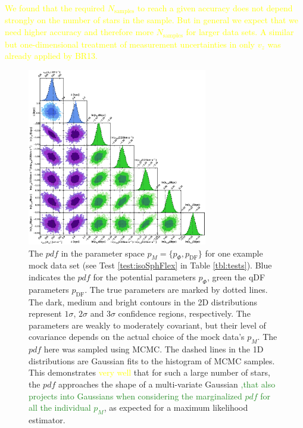 \documentclass[iop,revtex4,numberedappendix,appendixfloats]{emulateapj}
\newcommand{\pdf}{\ensuremath{pdf}}
\newcommand{\pmodel}{\ensuremath{p_M}}
\newcommand{\NEW}[1]{\textcolor{ForestGreen}{#1}}
\newcommand{\OLD}[1]{\textcolor{Yellow}{#1}}%
\begin{document}
\OLD{We found that the required $N_\text{samples}$ to reach a given accuracy does not depend strongly on the number of stars in the sample. But in general we expect that we need higher accuracy and therefore more $N_\text{samples}$ for larger data sets.}
\OLD{A similar but one-dimensional treatment of measurement uncertainties in only $v_z$ was already applied by BR13.}


\begin{figure}[!htbp]
\centering
\includegraphics[width=0.7\textwidth]{figs/isoSphFlex_short_hot_2kpc_triangle_MCMC.eps}
\caption{The \pdf{} in the parameter space $\pmodel{} = \{p_\Phi,p_\text{DF}\}$ for one example mock data set (see Test \ref{test:isoSphFlex} in Table \ref{tbl:tests}). Blue indicates the \pdf{} for the potential parameters $p_\Phi$, green the qDF parameters $p_\text{DF}$. The true parameters are marked by dotted lines. The dark, medium and bright contours in the 2D distributions represent $1\sigma$, $2\sigma$ and $3\sigma$ confidence regions, respectively. The parameters are weakly to moderately covariant, but their level of covariance depends on the actual choice of the mock data's \pmodel{}. The \pdf{} here was sampled using MCMC. The dashed lines in the 1D distributions are Gaussian fits to the histogram of MCMC samples. This demonstrates \OLD{very well} that for such a large number of stars, the \pdf{} approaches the shape of a multi-variate Gaussian \NEW{,that also projects into Gaussians when considering the marginalized \pdf{} for all the individual \pmodel{}}, as expected for a maximum likelihood estimator.}
\label{fig:isoSphFlex_triangleplot}
\end{figure}
\end{document}
